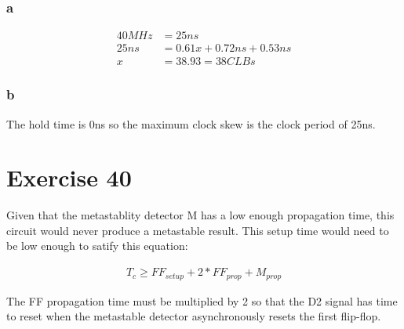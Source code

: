 \documentclass[11pt]{article}
\begin{document}
\subsubsection*{a}

\begin{align*}
40 MHz &= 25ns\\
25ns &= 0.61x + 0.72ns + 0.53ns\\
x &= 38.93 = 38 CLBs
\end{align*}
\subsubsection*{b}
The hold time is 0ns so the maximum clock skew is the clock period of 25ns.

\section*{Exercise 40}
Given that the metastablity detector M has a low enough propagation time, this
circuit would never produce a metastable result. This setup time would need to be
low enough to satify this equation:

\begin{align*}
T_c \geq FF_{setup} + 2*FF_{prop} + M_{prop}
\end{align*}

The FF propagation time must be multiplied by 2 so that the D2 signal has time to
reset when the metastable detector asynchronously resets the first flip-flop.
\end{document}
